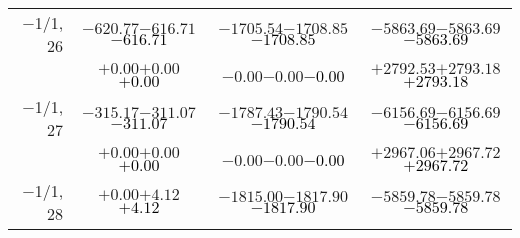 \documentclass[compress]{beamer}
\begin{document}
\begin{frame}
{\begin{tabular}{r | c | c | c}
$-$1/1, 26 & $-620.77$\hspace{0.1 cm}$-616.71$\hspace{0.1 cm}\textcolor{black}{$-616.71$} & $-1705.54$\hspace{0.1 cm}$-1708.85$\hspace{0.1 cm}\textcolor{black}{$-1708.85$} & $-5863.69$\hspace{0.1 cm}$-5863.69$\hspace{0.1 cm}\textcolor{black}{$-5863.69$} \\
           & $+0.00$\hspace{0.1 cm}$+0.00$\hspace{0.1 cm}\textcolor{black}{$+0.00$} & $-0.00$\hspace{0.1 cm}$-0.00$\hspace{0.1 cm}\textcolor{black}{$-0.00$} & $+2792.53$\hspace{0.1 cm}$+2793.18$\hspace{0.1 cm}\textcolor{black}{$+2793.18$} \\
$-$1/1, 27 & $-315.17$\hspace{0.1 cm}$-311.07$\hspace{0.1 cm}\textcolor{black}{$-311.07$} & $-1787.43$\hspace{0.1 cm}$-1790.54$\hspace{0.1 cm}\textcolor{black}{$-1790.54$} & $-6156.69$\hspace{0.1 cm}$-6156.69$\hspace{0.1 cm}\textcolor{black}{$-6156.69$} \\
           & $+0.00$\hspace{0.1 cm}$+0.00$\hspace{0.1 cm}\textcolor{black}{$+0.00$} & $-0.00$\hspace{0.1 cm}$-0.00$\hspace{0.1 cm}\textcolor{black}{$-0.00$} & $+2967.06$\hspace{0.1 cm}$+2967.72$\hspace{0.1 cm}\textcolor{black}{$+2967.72$} \\
$-$1/1, 28 & $+0.00$\hspace{0.1 cm}$+4.12$\hspace{0.1 cm}\textcolor{black}{$+4.12$} & $-1815.00$\hspace{0.1 cm}$-1817.90$\hspace{0.1 cm}\textcolor{black}{$-1817.90$} & $-5859.78$\hspace{0.1 cm}$-5859.78$\hspace{0.1 cm}\textcolor{black}{$-5859.78$} \\

\end{tabular}}
\end{frame}
\end{document}
